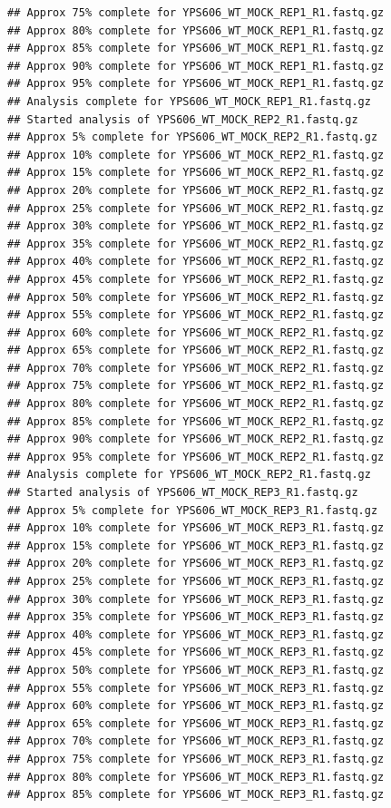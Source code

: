 \documentclass[
]{book}
\begin{document}
\begin{verbatim}
## Approx 75% complete for YPS606_WT_MOCK_REP1_R1.fastq.gz
## Approx 80% complete for YPS606_WT_MOCK_REP1_R1.fastq.gz
## Approx 85% complete for YPS606_WT_MOCK_REP1_R1.fastq.gz
## Approx 90% complete for YPS606_WT_MOCK_REP1_R1.fastq.gz
## Approx 95% complete for YPS606_WT_MOCK_REP1_R1.fastq.gz
## Analysis complete for YPS606_WT_MOCK_REP1_R1.fastq.gz
## Started analysis of YPS606_WT_MOCK_REP2_R1.fastq.gz
## Approx 5% complete for YPS606_WT_MOCK_REP2_R1.fastq.gz
## Approx 10% complete for YPS606_WT_MOCK_REP2_R1.fastq.gz
## Approx 15% complete for YPS606_WT_MOCK_REP2_R1.fastq.gz
## Approx 20% complete for YPS606_WT_MOCK_REP2_R1.fastq.gz
## Approx 25% complete for YPS606_WT_MOCK_REP2_R1.fastq.gz
## Approx 30% complete for YPS606_WT_MOCK_REP2_R1.fastq.gz
## Approx 35% complete for YPS606_WT_MOCK_REP2_R1.fastq.gz
## Approx 40% complete for YPS606_WT_MOCK_REP2_R1.fastq.gz
## Approx 45% complete for YPS606_WT_MOCK_REP2_R1.fastq.gz
## Approx 50% complete for YPS606_WT_MOCK_REP2_R1.fastq.gz
## Approx 55% complete for YPS606_WT_MOCK_REP2_R1.fastq.gz
## Approx 60% complete for YPS606_WT_MOCK_REP2_R1.fastq.gz
## Approx 65% complete for YPS606_WT_MOCK_REP2_R1.fastq.gz
## Approx 70% complete for YPS606_WT_MOCK_REP2_R1.fastq.gz
## Approx 75% complete for YPS606_WT_MOCK_REP2_R1.fastq.gz
## Approx 80% complete for YPS606_WT_MOCK_REP2_R1.fastq.gz
## Approx 85% complete for YPS606_WT_MOCK_REP2_R1.fastq.gz
## Approx 90% complete for YPS606_WT_MOCK_REP2_R1.fastq.gz
## Approx 95% complete for YPS606_WT_MOCK_REP2_R1.fastq.gz
## Analysis complete for YPS606_WT_MOCK_REP2_R1.fastq.gz
## Started analysis of YPS606_WT_MOCK_REP3_R1.fastq.gz
## Approx 5% complete for YPS606_WT_MOCK_REP3_R1.fastq.gz
## Approx 10% complete for YPS606_WT_MOCK_REP3_R1.fastq.gz
## Approx 15% complete for YPS606_WT_MOCK_REP3_R1.fastq.gz
## Approx 20% complete for YPS606_WT_MOCK_REP3_R1.fastq.gz
## Approx 25% complete for YPS606_WT_MOCK_REP3_R1.fastq.gz
## Approx 30% complete for YPS606_WT_MOCK_REP3_R1.fastq.gz
## Approx 35% complete for YPS606_WT_MOCK_REP3_R1.fastq.gz
## Approx 40% complete for YPS606_WT_MOCK_REP3_R1.fastq.gz
## Approx 45% complete for YPS606_WT_MOCK_REP3_R1.fastq.gz
## Approx 50% complete for YPS606_WT_MOCK_REP3_R1.fastq.gz
## Approx 55% complete for YPS606_WT_MOCK_REP3_R1.fastq.gz
## Approx 60% complete for YPS606_WT_MOCK_REP3_R1.fastq.gz
## Approx 65% complete for YPS606_WT_MOCK_REP3_R1.fastq.gz
## Approx 70% complete for YPS606_WT_MOCK_REP3_R1.fastq.gz
## Approx 75% complete for YPS606_WT_MOCK_REP3_R1.fastq.gz
## Approx 80% complete for YPS606_WT_MOCK_REP3_R1.fastq.gz
## Approx 85% complete for YPS606_WT_MOCK_REP3_R1.fastq.gz

\end{verbatim}
\end{document}

